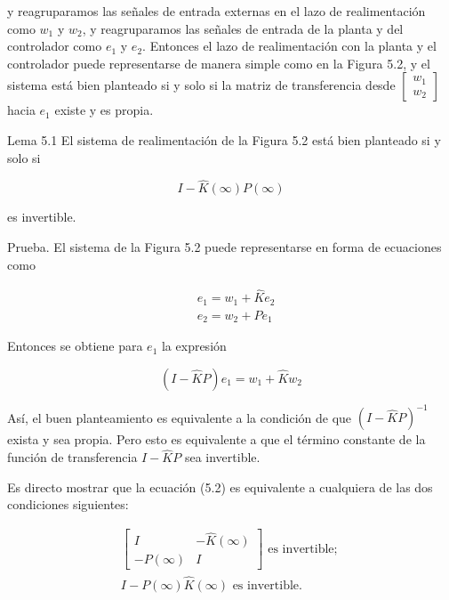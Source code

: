 y reagruparamos las señales de entrada externas en el lazo de realimentación como $w_{1}$ y $w_{2}$, y reagruparamos las señales de entrada de la planta y del controlador como $e_{1}$ y $e_{2}$. Entonces el lazo de realimentación con la planta y el controlador puede representarse de manera simple como en la Figura 5.2, y el sistema está bien planteado si y solo si la matriz de transferencia desde $\left[\begin{array}{l}w_{1} \\ w_{2}\end{array}\right]$ hacia $e_{1}$ existe y es propia.


Lema 5.1 El sistema de realimentación de la Figura 5.2 está bien planteado si y solo si


\begin{equation*}
I-\hat{K}(\infty) P(\infty) \tag{5.2}
\end{equation*}


es invertible.

Prueba. El sistema de la Figura 5.2 puede representarse en forma de ecuaciones como

$$
\begin{aligned}
& e_{1}=w_{1}+\hat{K} e_{2} \\
& e_{2}=w_{2}+P e_{1}
\end{aligned}
$$

Entonces se obtiene para $e_{1}$ la expresión

$$
(I-\hat{K} P) e_{1}=w_{1}+\hat{K} w_{2}
$$

Así, el buen planteamiento es equivalente a la condición de que $(I-\hat{K} P)^{-1}$ exista y sea propia. Pero esto es equivalente a que el término constante de la función de transferencia $I-\hat{K} P$ sea invertible.

Es directo mostrar que la ecuación (5.2) es equivalente a cualquiera de las dos condiciones siguientes:


\begin{gather*}
{\left[\begin{array}{cc}
I & -\hat{K}(\infty) \\
-P(\infty) & I
\end{array}\right] \text { es invertible; }}  \tag{5.3}\\
I-P(\infty) \hat{K}(\infty) \text { es invertible. }
\end{gather*}


